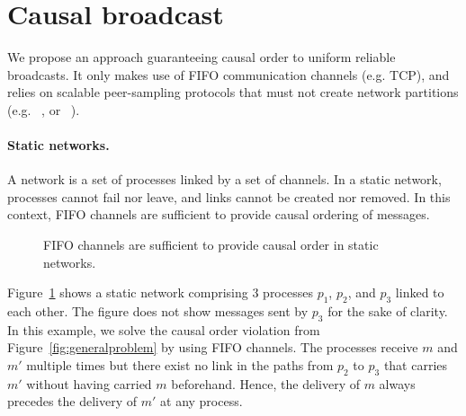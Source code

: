 
\section{Causal broadcast}
\label{sec:proposal}

We propose an approach guaranteeing causal order to uniform reliable
broadcasts. It only makes use of FIFO communication channels (e.g. TCP), and
relies on scalable peer-sampling protocols that must not create network partitions
(e.g. \SPRAY~\cite{nedelec2017adaptive}, or \CYCLON~\cite{voulgaris2005cyclon}).

\paragraph{Static networks.} A network is a set of processes linked by a set of
channels. In a static network, processes cannot fail nor leave, and links cannot
be created nor removed. In this context, FIFO channels are sufficient to provide
causal ordering of messages.

\begin{figure}
  \begin{center}
    
    \caption{\label{fig:static}FIFO channels are sufficient to provide causal
      order in static networks.}
  \end{center}
\end{figure}

Figure~\ref{fig:static} shows a static network comprising 3 processes $p_1$,
$p_2$, and $p_3$ linked to each other. The figure does not show messages sent by
$p_3$ for the sake of clarity. In this example, we solve the causal order
violation from Figure~\ref{fig:generalproblem} by using FIFO channels. The
processes receive $m$ and $m'$ multiple times but there exist no link in the
paths from $p_2$ to $p_3$ that carries $m'$ without having carried $m$
beforehand. Hence, the delivery of $m$ always precedes the delivery of $m'$ at
any process.

\begin{theorem}
\end{theorem}

